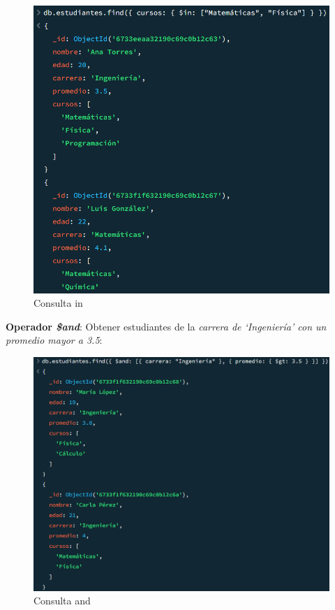 \begin{figure}[H]
  \centering
  \includegraphics[scale = 0.8]{Imagenes/parte3/3.4.png}
  \caption{Consulta in}
\end{figure}

\textbf{Operador \emph{\$and}}: Obtener estudiantes de la \textit{carrera de `Ingeniería' con un promedio mayor a 3.5}:

\begin{figure}[H]
  \centering
  \includegraphics[scale = 0.6]{Imagenes/parte3/3.5.png}
  \caption{Consulta and}
\end{figure}

